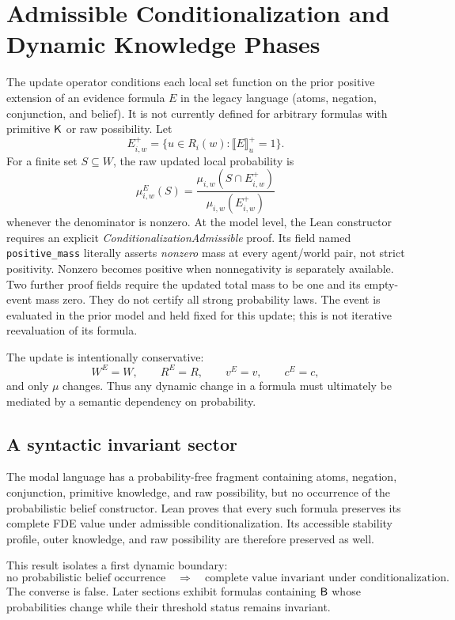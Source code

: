 \section{Admissible Conditionalization and Dynamic Knowledge Phases}
\label{sec:dynamics}

The update operator conditions each local set function on the prior positive
extension of an evidence formula \(E\) in the legacy language (atoms, negation,
conjunction, and belief). It is not currently defined for arbitrary formulas
with primitive \(\mathsf{K}\) or raw possibility. Let
\[
  E^+_{i,w}
  =\{u\in R_i(w):\llbracket E\rrbracket_u^+=1\}.
\]
For a finite set \(S\subseteq W\), the raw updated local probability is
\[
  \mu^{E}_{i,w}(S)
  =
  \frac{\mu_{i,w}(S\cap E^+_{i,w})}
       {\mu_{i,w}(E^+_{i,w})}
\]
whenever the denominator is nonzero. At the model level, the Lean constructor
requires an explicit \emph{ConditionalizationAdmissible} proof. Its field named
\texttt{positive\_mass} literally asserts \emph{nonzero} mass at every
agent/world pair, not strict positivity. Nonzero becomes positive when
nonnegativity is separately available. Two further proof fields require the
updated total mass to be one and its empty-event mass zero. They do not certify
all strong probability laws. The event is evaluated in the prior model and
held fixed for this update; this is not iterative reevaluation of its formula.

The update is intentionally conservative:
\[
  W^E=W,\qquad
  R^E=R,\qquad
  v^E=v,\qquad
  c^E=c,
\]
and only \(\mu\) changes. Thus any dynamic change in a formula must ultimately be mediated by a semantic dependency on probability.

\subsection{A syntactic invariant sector}

The modal language has a probability-free fragment containing atoms, negation, conjunction, primitive knowledge, and raw possibility, but no occurrence of the probabilistic belief constructor. Lean proves that every such formula preserves its complete FDE value under admissible conditionalization. Its accessible stability profile, outer knowledge, and raw possibility are therefore preserved as well.

This result isolates a first dynamic boundary:
\[
  \text{no probabilistic belief occurrence}
  \quad\Longrightarrow\quad
  \text{complete value invariant under conditionalization}.
\]
The converse is false. Later sections exhibit formulas containing \(\mathsf{B}\) whose probabilities change while their threshold status remains invariant.

